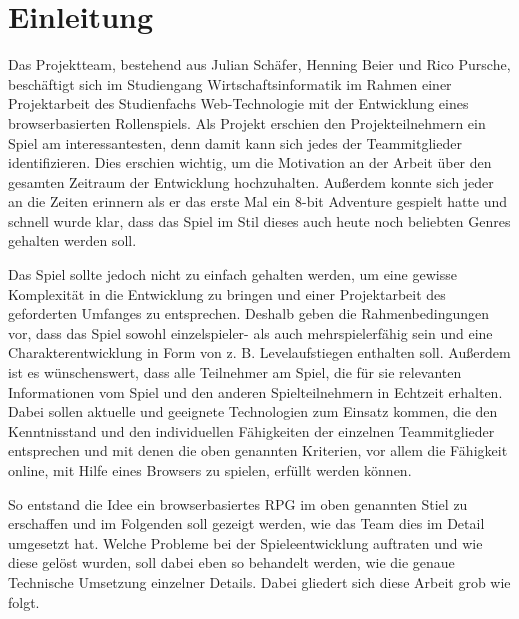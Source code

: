 

\section{Einleitung}

Das Projektteam, bestehend aus Julian Schäfer, Henning Beier und Rico Pursche, beschäftigt sich im Studiengang Wirtschaftsinformatik im Rahmen einer Projektarbeit des Studienfachs Web-Technologie mit der Entwicklung eines browserbasierten Rollenspiels. 
Als Projekt erschien den Projekteilnehmern ein Spiel am interessantesten, denn damit kann sich jedes der Teammitglieder identifizieren. Dies erschien wichtig, um die Motivation an der Arbeit über den gesamten Zeitraum der Entwicklung hochzuhalten. Außerdem konnte sich jeder an die Zeiten erinnern als er das erste Mal ein 8-bit Adventure gespielt hatte und schnell wurde klar, dass das Spiel im Stil dieses auch heute noch beliebten Genres gehalten werden soll.

Das Spiel sollte jedoch nicht zu einfach gehalten werden, um eine gewisse Komplexität in die Entwicklung zu bringen und einer Projektarbeit des geforderten Umfanges zu entsprechen. Deshalb geben die Rahmenbedingungen vor, dass das Spiel sowohl einzelspieler- als auch mehrspielerfähig sein und eine Charakterentwicklung in Form von z. B. Levelaufstiegen enthalten soll. Außerdem ist es wünschenswert, dass alle Teilnehmer am Spiel, die für sie relevanten Informationen vom Spiel und den anderen Spielteilnehmern in Echtzeit erhalten. Dabei sollen aktuelle und geeignete Technologien zum Einsatz kommen, die den Kenntnisstand und den individuellen Fähigkeiten der einzelnen Teammitglieder entsprechen und mit denen die oben genannten Kriterien, vor allem die Fähigkeit online, mit Hilfe eines Browsers zu spielen, erfüllt werden können. 

So entstand die Idee ein browserbasiertes RPG im oben genannten Stiel zu erschaffen und im Folgenden soll gezeigt werden, wie das Team dies im Detail umgesetzt hat. Welche Probleme bei der Spieleentwicklung auftraten und wie diese gelöst wurden, soll dabei eben so behandelt werden, wie die genaue Technische Umsetzung einzelner Details. Dabei gliedert sich diese Arbeit grob wie folgt.

